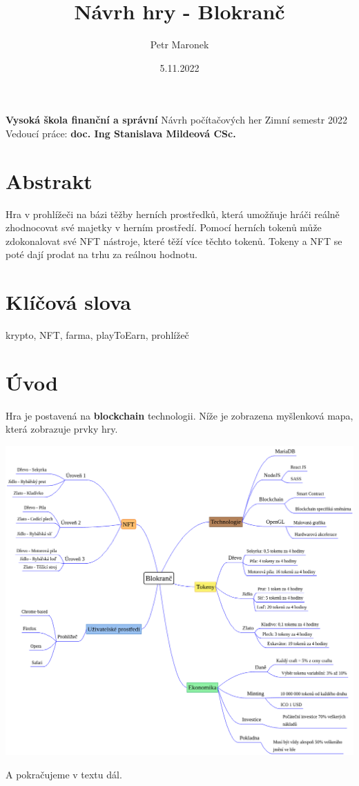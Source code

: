 \documentclass{article}
\title{Návrh hry - Blokranč}
\author{Petr Maronek}
\date{5.11.2022}
\begin{document}
	\begin{spacing}{1.15}
		\rmfamily
		\maketitle
		\begin{center}
			\textbf{Vysoká škola finanční a správní}\linebreak
			Návrh počítačových her\linebreak
			Zimní semestr 2022\linebreak
			Vedoucí práce: \textbf{doc. Ing Stanislava Mildeová CSc.}
		\end{center}
		\pagebreak
			
		\section*{Abstrakt}
		Hra v prohlížeči na bázi těžby herních prostředků, která umožňuje hráči reálně zhodnocovat své majetky v herním prostředí. Pomocí herních tokenů může zdokonalovat své NFT nástroje, které těží více těchto tokenů. Tokeny a NFT se poté dají prodat na trhu za reálnou hodnotu.
				
		\section*{Klíčová slova}
		krypto, NFT, farma, playToEarn, prohlížeč
		\pagebreak
		    
		\section*{Úvod}
		Hra je postavená na \textbf{blockchain} technologii. Níže je zobrazena myšlenková mapa, která zobrazuje prvky hry.\linebreak
		
		\label{Myšlenková mapa}
		\includegraphics[scale=0.3]{221104-NPH-Blokranč.png}
		
		A pokračujeme v textu dál.
	
	\end{spacing}
\end{document}
